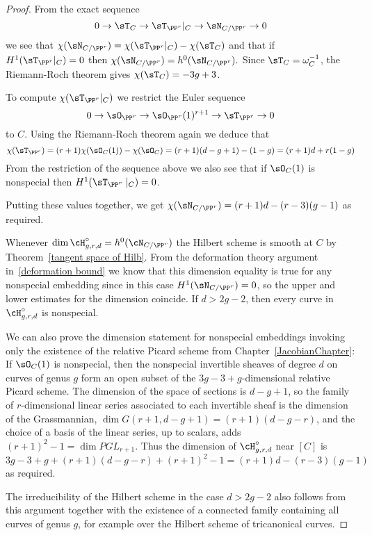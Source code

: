 \begin{proof} 
From the exact sequence
$$
0 \to \sT_C \to \sT_{\PP^r}|_C \to \sN_{C/\PP^r} \to 0
$$
we see that $\chi(\sN_{C/\PP^r}) = \chi(\sT_{\PP^r}|_C) - \chi(\sT_C)$
and that if $H^1( \sT_{\PP^r}|_C) = 0$ then $\chi(\sN_{C/\PP^r}) = h^0(\sN_{C/\PP^r}).$
Since $\sT_C = \omega_C^{-1}$, the Riemann-Roch theorem gives $\chi(\sT_C) = -3g+3$.

To compute $\chi(\sT_{\PP^r}|_C)$ we restrict the Euler sequence
$$
0\to \sO_{\PP^r} \to \sO_{\PP^r}(1)^{r+1} \to \sT_{\PP^r} \to 0
$$
to $C$.
Using the Riemann-Roch theorem again we deduce that
$$
\chi( \sT_{\PP^r} ) = (r+1)\chi(\sO_C(1)) - \chi(\sO_C) = (r+1)(d-g+1) - (1-g) = (r+1)d + r(1-g)
$$
From the restriction of the sequence above we also see that
if $\sO_C(1)$ is nonspecial then $H^1(\sT_{\PP^r}\mid_C) = 0$.

Putting these values together, we get
$
\chi(\sN_{C/\PP^r}) = (r+1)d - (r-3)(g-1)
$
as required.

Whenever $\dim \cH^\circ_{g,r,d} = h^{0}(\cN_{C/\PP^{r}}) $ the Hilbert scheme is smooth at $C$ by
Theorem~\ref{tangent space of Hilb}. 
From the deformation theory argument
in~\ref{deformation bound} we know that this dimension equality is true for any
nonspecial embedding since in this case 
$H^1(\sN_{C/\PP^r}) = 0$, so the upper and lower estimates for the dimension
coincide. If $d>2g-2$, then every curve in $\cH^\circ_{g,r,d}$ is nonspecial.

We can also prove the dimension statement for nonspecial embeddings invoking only the existence of the relative Picard scheme from
Chapter~\ref{JacobianChapter}: 
If $\sO_C(1)$ is nonspecial, then the
nonspecial invertible sheaves of degree $d$ on curves of genus $g$
 form an open subset of the $3g-3+ g$-dimensional relative Picard scheme. The dimension
 of the space of sections is $d-g+1$, so the family of $r$-dimensional linear series associated to
 each invertible sheaf is the dimension of the Grassmannian, $\dim G(r+1, d-g+1) = (r+1)(d-g-r)$,
 and the choice of a basis of the linear series, up to scalars, adds $(r+1)^2-1 = \dim PGL_{r+1}$. 
 Thus the dimension of  $\cH^\circ_{g,r,d}$ near $[C]$ is
$$
3g-3+ g + (r+1)(d-g-r) + (r+1)^2-1 = (r+1)d - (r-3)(g-1)
$$
as required. 

The irreducibility of the Hilbert scheme in the case $d>2g-2$ also follows from this argument 
together with the existence of a connected family containing all curves of genus $g$, for example over the
Hilbert scheme of tricanonical curves.
\end{proof}


